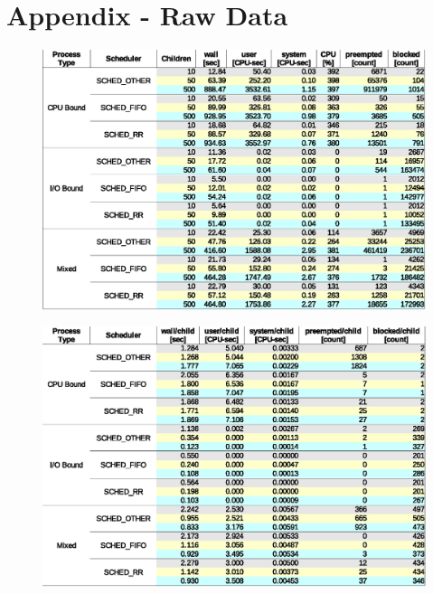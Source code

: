 ﻿\section{Appendix - Raw Data}

\begin{figure}[hbtp]
  \centering
  \caption{}
  \includegraphics[scale=1.0]{img/raw-results-table.eps}
  \label{tab:raw-results}
\end{figure}

\begin{figure}[hbtp]
  \centering
  \caption{}
  \includegraphics[scale=1.0]{img/raw-results-child-table.eps}
  \label{tab:raw-results-child}
\end{figure}

